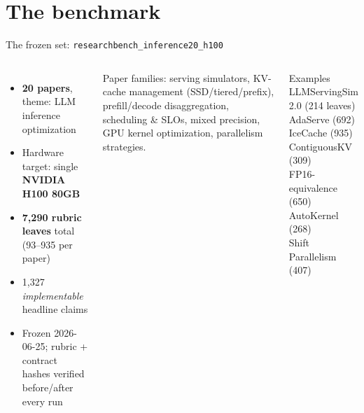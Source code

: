 \documentclass[aspectratio=169]{beamer}
\begin{document}
\section{The benchmark}

\begin{frame}{The frozen set: \texttt{researchbench\_inference20\_h100}}
  \begin{columns}[T]
      \begin{itemize}
        \item \textbf{20 papers}, theme: LLM inference optimization
        \item Hardware target: single \textbf{NVIDIA H100 80GB}
        \item \textbf{7{,}290 rubric leaves} total (93--935 per paper)
        \item 1{,}327 \emph{implementable} headline claims
        \item Frozen 2026-06-25; rubric + contract hashes verified before/after every run
      \end{itemize}
      \vspace{0.5em}
      Paper families: serving simulators, KV-cache management (SSD/tiered/prefix),
      prefill/decode disaggregation, scheduling \& SLOs, mixed precision,
      GPU kernel optimization, parallelism strategies.
      \begin{block}{Examples}
        \footnotesize
        LLMServingSim 2.0 (214 leaves)\\
        AdaServe (692)\\
        IceCache (935)\\
        ContiguousKV (309)\\
        FP16-equivalence (650)\\
        AutoKernel (268)\\
        Shift Parallelism (407)
      \end{block}
  \end{columns}
\end{frame}
\end{document}
